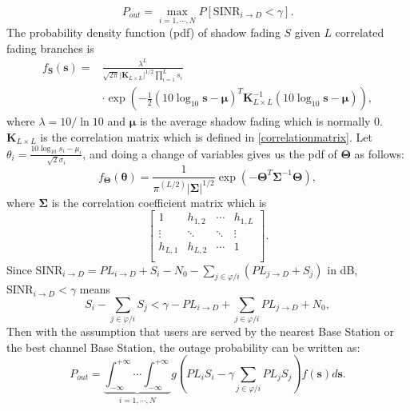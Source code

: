 \begin{equation}
P_{out} = \max_{i = 1,\cdots,N} P[\text{SINR}_{i\to D}<\gamma].
\end{equation}
The probability density function (pdf) of shadow fading $S$ given $L$ correlated fading branches is
\begin{equation}
\begin{split}
f_{\mathbf{S}}(\mathbf{s}) = &\frac{\lambda^{L}}{\sqrt{2\pi}|\mathbf{K}_{L\times L}|^{1/2}\prod_{i=1}^{L}s_{i}}\\
&\cdot\exp(-\frac{1}{2}(10\log_{10}\mathbf{s}-\boldsymbol{\mu})^{T}\mathbf{K}_{L\times L}^{-1}(10\log_{10}\mathbf{s}-\boldsymbol{\mu})),
\end{split}
\end{equation}
where $\lambda = 10/\ln10$ and $\boldsymbol{\mu}$ is the average shadow fading which is normally $0$. $\mathbf{K}_{L\times L}$ is the correlation matrix which is defined in \eqref{correlationmatrix}. Let $\theta_{i} = \frac{10\log_{10}s_{i}-\mu_{i}}{\sqrt{2}\sigma_{i}}$, and doing a change of variables gives us the pdf of $\mathbf{\Theta}$ as follows:
\begin{equation}
f_{\mathbf{\Theta}}(\mathbf{\theta}) = \frac{1}{\pi^(L/2)|\mathbf{\Sigma}|^{1/2}}\exp(-\mathbf{\Theta}^{T}\mathbf{\Sigma}^{-1}\mathbf{\Theta}),
\end{equation}
where $\mathbf{\Sigma}$ is the correlation coefficient matrix which is
\begin{equation}
\left[\begin{array}{cccc}
1 & h_{1,2} & \cdots & h_{1,L}\\
\vdots & \ddots & \ddots & \vdots\\
h_{L,1} & h_{L,2} & \cdots & 1\\
\end{array}\right].
\end{equation}
Since $\text{SINR}_{i\to D}=PL_{i\to D}+S_{i}-N_{0}-\sum_{j\in\varphi/i}(PL_{j\to D} + S_{j})$ in dB, $\text{SINR}_{i\to D}<\gamma$ means
\begin{equation}
S_{i} - \sum_{j\in\varphi/i}S_{j}<\gamma -PL_{i\to D} + \sum_{j\in\varphi/i}PL_{j\to D} + N_{0},
\end{equation}
Then with the assumption that users are served by the nearest Base Station or the best channel Base Station, the outage probability can be written as:
\begin{equation}
\label{outprob}
P_{out} = \underbrace{\int_{-\infty}^{+\infty}\cdots\int_{-\infty}^{+\infty}}_{i =1,\cdots,N} g(PL_{i}S_{i} - \gamma\sum_{j\in\varphi/i}PL_{j}S_{j})f(\mathbf{s})d\mathbf{s}.
\end{equation}
